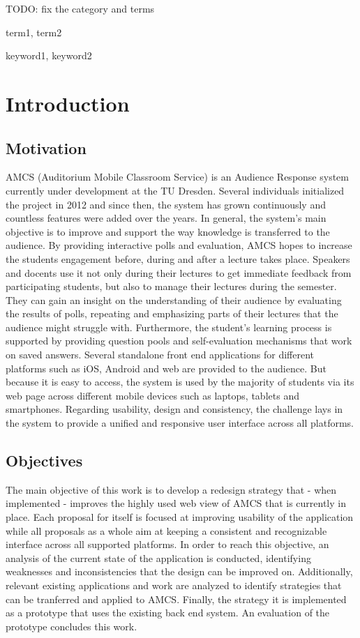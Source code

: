 \documentclass{sigplanconf}
\begin{document}
TODO: fix the category and terms

\terms
term1, term2

\keywords
keyword1, keyword2

\section{Introduction}

\subsection{Motivation}


AMCS (Auditorium Mobile Classroom Service) is an Audience Response system currently under  development at the TU Dresden. Several individuals initialized the project in 2012 and since then, the system has grown continuously and countless features were added over the years. In general, the system's main objective is to improve and support the way knowledge is transferred to the audience. By providing interactive polls and evaluation, AMCS hopes to increase the students engagement before, during and after a lecture takes place. Speakers and docents use it not only during their lectures to get immediate feedback from participating students, but also to manage their lectures during the semester. They can gain an insight on the understanding of their audience by evaluating the results of polls, repeating and emphasizing parts of their lectures that the audience might struggle with. Furthermore, the student's learning process is supported by providing question pools and self-evaluation mechanisms that work on saved answers. 
Several standalone front end applications for different platforms such as iOS, Android and web are provided to the audience. But because it is easy to access, the system is used by the majority of students via its web page across different mobile devices such as laptops, tablets and smartphones. 
Regarding usability, design and consistency, the challenge lays in the system to provide a unified and responsive user interface across all platforms.

\subsection{Objectives}

The main objective of this work is to develop a redesign strategy that - when implemented - improves the highly used web view of AMCS that is currently in place.
Each proposal for itself is focused at improving usability of the application while all proposals as a whole aim at keeping a consistent and recognizable interface across all supported platforms. 
In order to reach this objective, an analysis of the current state of the application is conducted, identifying weaknesses and inconsistencies that the design can be improved on.
Additionally, relevant existing applications and work are analyzed to identify strategies that can be tranferred and applied to AMCS. 
Finally, the strategy it is implemented as a prototype that uses the existing back end system. An evaluation of the prototype concludes this work.
\end{document}
